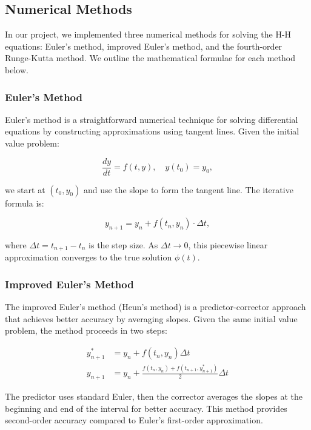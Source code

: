 \subsection{Numerical Methods}
\label{subsection:numerical-methods}

    In our project, we implemented three numerical methods for solving the H-H equations: Euler's method, improved Euler's method, and the fourth-order Runge-Kutta method.  
    We outline the mathematical formulae for each method below.

    \subsubsection{Euler's Method}
    \label{subsubsec:euler-method}

        Euler's method is a straightforward numerical technique for solving differential equations by constructing approximations using tangent lines.  
        Given the initial value problem:

        \[
        \frac{dy}{dt} = f(t, y), \quad y(t_0) = y_0,
        \]

        we start at $(t_0, y_0)$ and use the slope to form the tangent line.  
        The iterative formula is:

        \[
        y_{n+1} = y_n + f(t_n, y_n) \cdot \Delta t,
        \]

        where $\Delta t = t_{n+1} - t_n$ is the step size.  
        As $\Delta t \to 0$, this piecewise linear approximation converges to the true solution $\phi(t)$.

    \subsubsection{Improved Euler's Method}
    \label{subsubsec:improved-euler}

        The improved Euler's method (Heun's method) is a predictor-corrector approach that achieves better accuracy by averaging slopes.  
        Given the same initial value problem, the method proceeds in two steps:

        \[
        \begin{aligned}
        y_{n+1}^* &= y_n + f(t_n, y_n) \Delta t\\[6pt]
        y_{n+1}   &= y_n + \frac{f(t_n, y_n) + f(t_{n+1}, y_{n+1}^*)}{2} \Delta t
        \end{aligned}
        \]

        The predictor uses standard Euler, then the corrector averages the slopes at the beginning and end of the interval for better accuracy.  
        This method provides second-order accuracy compared to Euler's first-order approximation.

